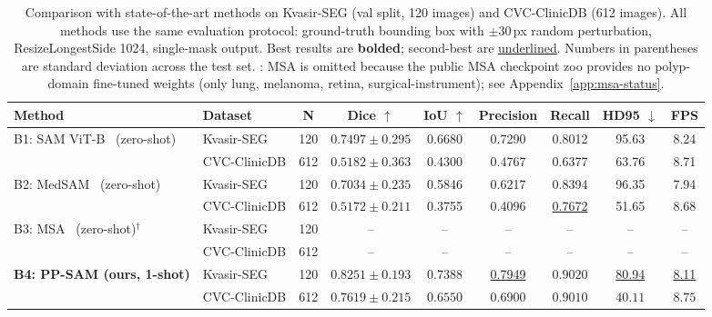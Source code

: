 \begin{table}[ht]
\centering
\caption{Comparison with state-of-the-art methods on Kvasir-SEG (val split, 120 images) and CVC-ClinicDB (612 images).
All methods use the same evaluation protocol: ground-truth bounding box with $\pm$30\,px random perturbation, ResizeLongestSide 1024, single-mask output.
Best results are \textbf{bolded}; second-best are \underline{underlined}.
Numbers in parentheses are standard deviation across the test set.
\dag: MSA is omitted because the public MSA checkpoint zoo provides no polyp-domain fine-tuned weights (only lung, melanoma, retina, surgical-instrument); see Appendix~\ref{app:msa-status}.}
\label{tab:sota}
\begin{tabular}{l l c c c c c c c}
\toprule
\textbf{Method} & \textbf{Dataset} & \textbf{N} & \textbf{Dice} $\uparrow$ & \textbf{IoU} $\uparrow$ & \textbf{Precision} & \textbf{Recall} & \textbf{HD95} $\downarrow$ & \textbf{FPS} \\
\midrule
\multirow{2}{*}{B1: SAM ViT-B~\citep{kirillov2023sam} (zero-shot)} & Kvasir-SEG & 120 & $0.7497 \pm 0.295$ & 0.6680 & 0.7290 & 0.8012 & 95.63 & 8.24 \\
 & CVC-ClinicDB  & 612 & $0.5182 \pm 0.363$ & 0.4300 & 0.4767 & 0.6377 & 63.76 & 8.71 \\
\midrule
\multirow{2}{*}{B2: MedSAM~\citep{ma2024medsam} (zero-shot)} & Kvasir-SEG & 120 & $0.7034 \pm 0.235$ & 0.5846 & 0.6217 & 0.8394 & 96.35 & 7.94 \\
 & CVC-ClinicDB  & 612 & $0.5172 \pm 0.211$ & 0.3755 & 0.4096 & \underline{0.7672} & 51.65 & 8.68 \\
\midrule
\multirow{2}{*}{B3: MSA~\citep{wu2023medical} (zero-shot)$^\dag$} & Kvasir-SEG & 120 & -- & -- & -- & -- & -- & -- \\
 & CVC-ClinicDB  & 612 & -- & -- & -- & -- & -- & -- \\
\midrule
\multirow{2}{*}{\textbf{B4: PP-SAM (ours, 1-shot)}} & Kvasir-SEG & 120 & $\mathbf{0.8251} \pm 0.193$ & $\mathbf{0.7388}$ & \underline{0.7949} & $\mathbf{0.9020}$ & \underline{80.94} & \underline{8.11} \\
 & CVC-ClinicDB  & 612 & $\mathbf{0.7619} \pm 0.215$ & $\mathbf{0.6550}$ & $\mathbf{0.6900}$ & $\mathbf{0.9010}$ & $\mathbf{40.11}$ & $\mathbf{8.75}$ \\
\bottomrule
\end{tabular}
\end{table}

